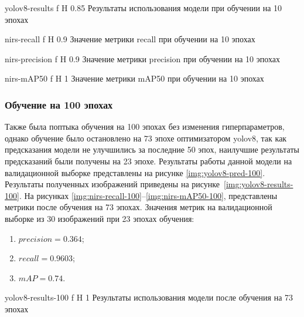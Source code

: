 {yolov8-results} %
{f} %
{H} %
{0.85\textwidth} %
{Результаты использования модели при обучении на 10 эпохах} %

{nirs-recall} %
{f} %
{H} %
{0.9\textwidth} %
{Значение метрики recall при обучении на 10 эпохах} %


{nirs-precision} %
{f} %
{H} %
{0.9\textwidth} %
{Значение метрики precision при обучении на 10 эпохах} %


{nirs-mAP50} %
{f} %
{H} %
{1\textwidth} %
{Значение метрики mAP50 при обучении на 10 эпохах} %

\subsubsection{Обучение на 100 эпохах}
\label{res:learn-100}
Также была поптыка обучения на 100 эпохах без изменения гиперпараметров, однако обучение было остановлено на 73 эпохе оптимизатором yolov8, так как предсказания модели не улучшились
за последние 50 эпох, наилучшие результаты предсказаний были получены на 23 эпохе. Результаты работы данной модели на валидационной выборке представлены на рисунке \ref{img:yolov8-pred-100}.
Результаты полученных изображений приведены на рисунке~\ref{img:yolov8-results-100}.
На рисунках \ref{img:nirs-recall-100}--\ref{img:nirs-mAP50-100}, представлены метрики после обучения на 73 эпохах.
Значения метрик  на валидационной выборке из 30 изображений при 23 эпохах обучения:
\begin{enumerate}
	\item $precision=0.364$;
	\item $recall=0.9603$;
	\item $mAP=0.74$.
\end{enumerate}


{yolov8-results-100} %
{f} %
{H} %
{1\textwidth} %
{Результаты использования модели после обучения на 73 эпохах} %

